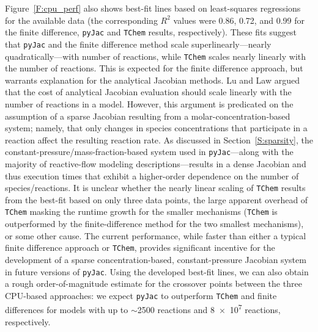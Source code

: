 \documentclass[preprint,12pt]{elsarticle}
\begin{document}
{Figure~\ref{F:cpu_perf} also shows best-fit lines based on least-squares regressions for the available data (the corresponding $R^2$ values were 0.86, 0.72, and 0.99 for the finite difference, \texttt{pyJac} and \texttt{TChem} results, respectively).
These fits suggest that \texttt{pyJac} and the finite difference method scale superlinearly---nearly quadratically---with number of reactions, while \texttt{TChem} scales nearly linearly with the number of reactions.
This is expected for the finite difference approach, but warrants explanation for the analytical Jacobian methods.
Lu and Law argued~\cite{Lu:2009gh} that the cost of analytical Jacobian evaluation should scale linearly with the number of reactions in a model.
However, this argument is predicated on the assumption of a sparse Jacobian resulting from a molar-concentration-based system; namely, that only changes in species concentrations that participate in a reaction affect the resulting reaction rate.
As discussed in Section~\ref{S:sparsity}, the constant-pressure\slash mass-fraction-based system used in \texttt{pyJac}---along with the majority of reactive-flow modeling descriptions---results in a dense Jacobian and thus execution times that exhibit a higher-order dependence on the number of species\slash reactions.
It is unclear whether the nearly linear scaling of \texttt{TChem} results from the best-fit based on only three data points, the large apparent overhead of \texttt{TChem} masking the runtime growth for the smaller mechanisms (\texttt{TChem} is outperformed by the finite-difference method for the two smallest mechanisms), or some other cause.
The current performance, while faster than either a typical finite difference approach or \texttt{TChem}, provides significant incentive for the development of a sparse concentration-based, constant-pressure Jacobian system in future versions of \texttt{pyJac}.
Using the developed best-fit lines, we can also obtain a rough order-of-magnitude estimate for the crossover points between the three CPU-based approaches: we expect \texttt{pyJac} to outperform \texttt{TChem} and finite differences for models with up to $\sim$2500 reactions and \num{8e7} reactions, respectively.

}
\end{document}
